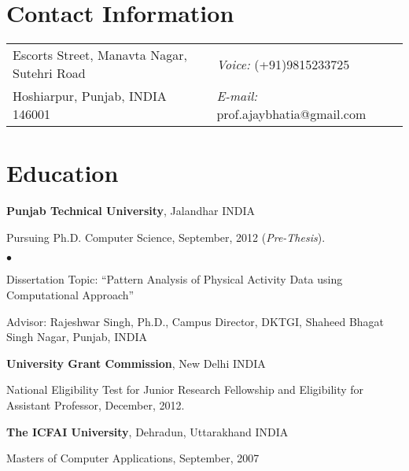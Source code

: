 \documentclass[margin,line]{res}
\newenvironment{list1}{
  \begin{list}{\ding{113}}{%
      \setlength{\itemsep}{0in}
      \setlength{\parsep}{0in} \setlength{\parskip}{0in}
      \setlength{\topsep}{0in} \setlength{\partopsep}{0in}
      \setlength{\leftmargin}{0.17in}}}{\end{list}}
\newenvironment{list2}{
  \begin{list}{$\bullet$}{%
      \setlength{\itemsep}{0in}
      \setlength{\parsep}{0in} \setlength{\parskip}{0in}
      \setlength{\topsep}{0in} \setlength{\partopsep}{0in}
      \setlength{\leftmargin}{0.2in}}}{\end{list}}
\begin{document}

\begin{resume}
\section{\sc Contact Information}
\vspace{.05in}
\begin{tabular}{@{}p{4in}p{4in}}
Escorts Street, Manavta Nagar, Sutehri Road & {\it Voice:}  (+91)9815233725\\
Hoshiarpur, Punjab, INDIA 146001 & {\it E-mail:}  prof.ajaybhatia@gmail.com\\
\end{tabular}

\section{\sc Education}
{\bf Punjab Technical University}, Jalandhar INDIA\\
\vspace*{-.1in}
\begin{list1}
\item[] Pursuing Ph.D. Computer Science, September, 2012 (\textit{Pre-Thesis}).
\begin{list2}
\vspace*{.05in}
\item Dissertation Topic:  ``Pattern Analysis of Physical Activity Data using Computational Approach''
\item Advisor:  Rajeshwar Singh, Ph.D., Campus Director, DKTGI, Shaheed Bhagat Singh Nagar, Punjab, INDIA
\end{list2}
\end{list1}

{\bf University Grant Commission}, New Delhi INDIA\\
\vspace*{-.1in}
\begin{list1}
\item[] National Eligibility Test for Junior Research Fellowship and Eligibility for Assistant Professor, December, 2012.
\end{list1}

{\bf The ICFAI University}, Dehradun, Uttarakhand INDIA\\
\vspace*{-.1in}
\begin{list1}
\item[] Masters of Computer Applications,  September, 2007
\end{list1}


\end{resume}
\end{document}
